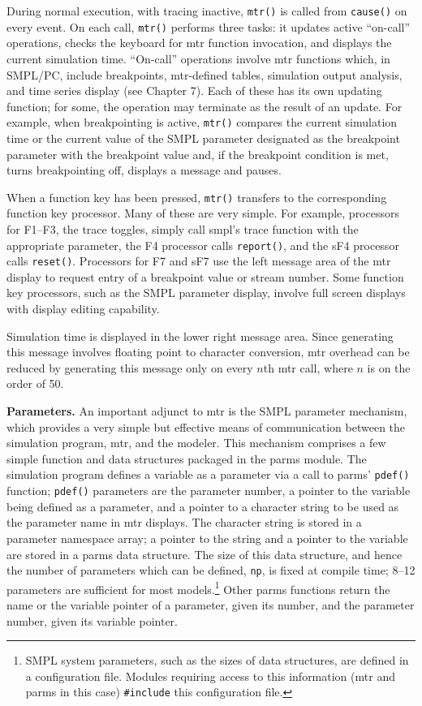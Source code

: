 During normal execution, with tracing inactive, \texttt{mtr()} is called from
\texttt{cause()} on every event. On each call, \texttt{mtr()} performs three tasks: it
updates active ``on-call'' operations, checks the keyboard for mtr function
invocation, and displays the current simulation time. ``On-call'' operations
involve mtr functions which, in SMPL/PC, include breakpoints, mtr-defined
tables, simulation output analysis, and time series display (see Chapter 7).
Each of these has its own updating function; for some, the operation may
terminate as the result of an update. For example, when breakpointing is
active, \texttt{mtr()} compares the current simulation time or the current value of
the SMPL parameter designated as the breakpoint parameter with the
breakpoint value and, if the breakpoint condition is met, turns breakpointing
off, displays a message and pauses.

When a function key has been pressed, \texttt{mtr()} transfers to the corresponding
function key processor. Many of these are very simple. For example,
processors for F1--F3, the trace toggles, simply call smpl's trace function with
the appropriate parameter, the F4 processor calls \texttt{report()}, and the sF4
processor calls \texttt{reset()}. Processors for F7 and sF7 use the left message area
of the mtr display to request entry of a breakpoint value or stream number.
Some function key processors, such as the SMPL parameter display, involve
full screen displays with display editing capability.

Simulation time is displayed in the lower right message area. Since
generating this message involves floating point to character conversion, mtr
overhead can be reduced by generating this message only on every $n$th mtr
call, where $n$ is on the order of 50.

\textbf{Parameters.} An important adjunct to mtr is the SMPL parameter mechanism,
which provides a very simple but effective means of communication
between the simulation program, mtr, and the modeler. This mechanism
comprises a few simple function and data structures packaged in the parms
module. The simulation program defines a variable as a parameter via a
call to parms' \texttt{pdef()} function; \texttt{pdef()} parameters are the parameter
number, a pointer to the variable being defined as a parameter, and a pointer
to a character string to be used as the parameter name in mtr displays. The
character string is stored in a parameter namespace array; a pointer to the
string and a pointer to the variable are stored in a parms data structure. The
size of this data structure, and hence the number of parameters which can be
defined, \texttt{np}, is fixed at compile time; 8--12 parameters are sufficient for most
models.\footnote{SMPL system parameters, such as the sizes of data structures, are defined in a configuration file. Modules requiring access to this information (mtr and parms in this case) \texttt{\#include} this configuration file.}
Other parms functions return the name or the variable pointer of a
parameter, given its number, and the parameter number, given its variable
pointer.

